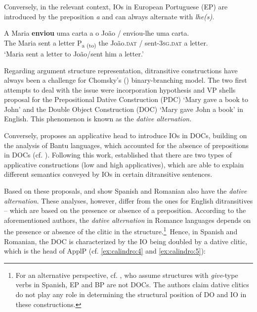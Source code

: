 \documentclass[output=paper,colorlinks,citecolor=brown,modfonts,nonflat]{langsci/langscibook}
\begin{document}
Conversely, in the relevant context, IOs in European Portuguese (EP) are introduced by the preposition \textit{a} and can always alternate with \textit{lhe(s)}.

\ea%
    \label{ex:calindro:3}
    \gll A    Maria \textbf{enviou} uma carta a o {João}            / enviou-{lhe}          uma carta.\\
    The Maria sent     a letter      P{\textsubscript{a (to)}} the João.\textsc{dat}  / sent-\textsc{3sg.dat}  a letter.\\
    \glt `Maria sent a letter to João/sent him a letter.'
    \z

Regarding argument structure representation, ditransitive constructions have always been a challenge for Chomsky’s (\citeyear{Chomsky1981,Chomsky1986}) binary-branching model. The two first attempts to deal with the issue were  incorporation hypothesis and  VP shells proposal for the Prepositional Dative Construction (PDC) ‘Mary gave a book to John’ and the Double Object Construction (DOC) ‘Mary gave John a book’ in English. This phenomenon is known as the \textit{dative alternation.}

Conversely, \citet{Marantz1993} proposes an applicative head to introduce IOs in DOCs, building on the analysis of Bantu languages, which accounted for the absence of prepositions in DOCs (cf. \citealt{AlsinaMchombo1993}). Following this work, \citet{Pylkkänen2002} established that there are two types of applicative constructions (low and high applicatives), which are able to explain different semantics conveyed by IOs in certain ditransitive sentences.

Based on these proposals, \citet{Cuervo2003} and \citet{DiaconescuRivero2007} show Spanish and Romanian also have the \textit{dative alternation}. These analyses, however, differ from the ones for English ditransitives – which are based on the presence or absence of a preposition. According to the aforementioned authors, the \textit{dative alternation} in Romance languages depends on the presence or absence of the clitic in the structure.\footnote{For an alternative perspective, cf. , who assume structures with \textit{give}-type verbs in Spanish, EP and BP are not DOCs. The authors claim dative clitics do not play any role in determining the structural position of DO and IO in these constructions.}~Hence, in Spanish and Romanian, the DOC is characterized by the IO being doubled by a dative clitic, which is the head of ApplP (cf. \ref{ex:calindro:4} and \ref{ex:calindro:5}):
\end{document}
